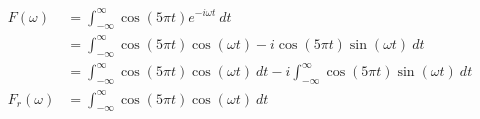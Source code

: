 \documentclass[preview]{standalone}
\begin{document}
\begin{align*}
F(\omega)&= \int_{-\infty}^{\infty} \cos{(5\pi t)}e^{-i\omega t} \ dt \\ &= \int_{-\infty}^{\infty} \cos{(5\pi t)}\cos{(\omega t)}-i\cos{(5\pi t)}\sin{(\omega t)} \ dt \\ &=\int_{-\infty}^{\infty} \cos{(5\pi t)}\cos{(\omega t)} \ dt - i\int_{-\infty}^{\infty} \cos{(5\pi t)}\sin{(\omega t)} \ dt \\  F_{r}(\omega)&=\int_{-\infty}^{\infty} \cos{(5\pi t)}\cos{(\omega t)} \ dt
\end{align*}
\end{document}
